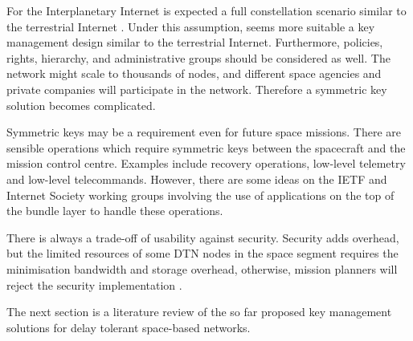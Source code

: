 For the Interplanetary Internet is expected a full constellation scenario similar to the terrestrial Internet \cite{rationale2010requirements}. Under this assumption, seems more suitable a key management design similar to the terrestrial Internet. Furthermore, policies, rights, hierarchy,  and administrative groups should be considered as well.  The network might scale to thousands of nodes, and different space agencies and private companies will participate in the network. Therefore a symmetric key solution becomes complicated.  

Symmetric keys may be a requirement even for future space missions. 
There are sensible operations which require symmetric keys between the spacecraft and the mission control centre. Examples include recovery operations, low-level telemetry and low-level telecommands.  However, there are some ideas on the IETF and Internet Society working groups involving the use of applications on the top of the bundle layer to handle these operations. 


There is always a trade-off of usability against security. Security adds overhead, but the limited resources of some DTN nodes in the space segment requires the minimisation bandwidth and storage overhead, otherwise, mission planners will reject the security implementation \cite{book2012architecture}.   

The next section is a literature review of the so far proposed key management solutions for delay tolerant space-based networks.











